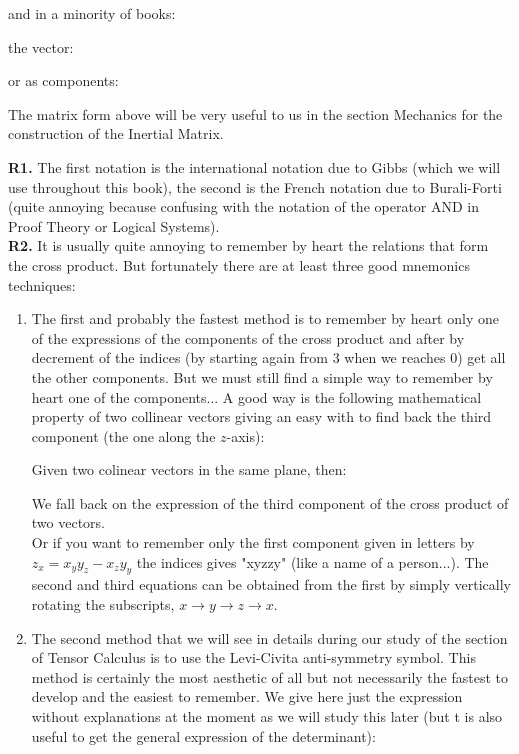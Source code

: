 	and in a minority of books:
	
	the vector:
	
	or as components:
	
	The matrix form above will be very useful to us in the section Mechanics for the construction of the Inertial Matrix.
	\begin{tcolorbox}[title=Remark,colframe=black,arc=10pt]
	\textbf{R1.} The first notation is the international notation due to Gibbs (which we will use throughout this book), the second is the French notation due to Burali-Forti (quite annoying because confusing with the notation of the operator AND in Proof Theory or Logical Systems).\\
	
	\textbf{R2.} It is usually quite annoying to remember by heart the relations that form the cross product. But fortunately there are at least three good mnemonics techniques:
	\begin{enumerate}

		\item The first and probably the fastest method is to remember by heart only one of the expressions of the components of the cross product and after by decrement of the indices (by starting again from $3$ when we reaches $0$) get all the other components. But we must still find a simple way to remember by heart one of the components... A good way is the following mathematical property of two collinear vectors giving an easy with to find back the third component (the one along the $z$-axis):
		
		Given two colinear vectors in the same plane, then:
		
		We fall back on the expression of the third component of the cross product of two vectors.\\
		
		Or if you want to remember only the first component given in letters by $z_x = x_y y_z - x_z y_y$ the indices gives "xyzzy" (like a name of a person...). The second and third equations can be obtained from the first by simply vertically rotating the subscripts, $x\rightarrow y \rightarrow  z \rightarrow x$. 
		
		\item The second method that we will see in details during our study of the section of Tensor Calculus is to use the Levi-Civita anti-symmetry symbol. This method is certainly the most aesthetic of all but not necessarily the fastest to develop and the easiest to remember. We give here just the expression without explanations at the moment as we will study this later (but t is also useful to get the general expression of the determinant):
		

\end{enumerate}
\end{tcolorbox}
